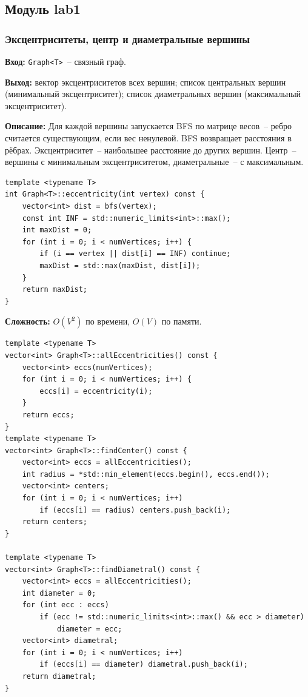 \subsection{Модуль lab1}

\subsubsection{Эксцентриситеты, центр и диаметральные вершины}

\textbf{Вход:} \texttt{Graph<T>}~-- связный граф.

\textbf{Выход:} вектор эксцентриситетов всех вершин; список центральных
вершин (минимальный эксцентриситет); список диаметральных вершин
(максимальный эксцентриситет).

\textbf{Описание:} Для каждой вершины запускается BFS по матрице весов~--
ребро считается существующим, если вес ненулевой. BFS возвращает
расстояния в рёбрах. Эксцентриситет~-- наибольшее расстояние до других вершин.
Центр~-- вершины с минимальным эксцентриситетом, диаметральные~-- с максимальным.

\begin{lstlisting}[style=cstyle, caption={BFS и вычисление эксцентриситета (graph.cpp)}]
template <typename T>
int Graph<T>::eccentricity(int vertex) const {
    vector<int> dist = bfs(vertex);
    const int INF = std::numeric_limits<int>::max();
    int maxDist = 0;
    for (int i = 0; i < numVertices; i++) {
        if (i == vertex || dist[i] == INF) continue;
        maxDist = std::max(maxDist, dist[i]);
    }
    return maxDist;
}
\end{lstlisting}

\textbf{Сложность:} $O(V^2)$ по времени, $O(V)$ по памяти.

\begin{lstlisting}[style=cstyle, caption={Поиск центра и диаметральных вершин (graph.cpp)}]
template <typename T>
vector<int> Graph<T>::allEccentricities() const {
	vector<int> eccs(numVertices);
	for (int i = 0; i < numVertices; i++) {
		eccs[i] = eccentricity(i);
	}
	return eccs;
}
template <typename T>
vector<int> Graph<T>::findCenter() const {
    vector<int> eccs = allEccentricities();
    int radius = *std::min_element(eccs.begin(), eccs.end());
    vector<int> centers;
    for (int i = 0; i < numVertices; i++)
        if (eccs[i] == radius) centers.push_back(i);
    return centers;
}

template <typename T>
vector<int> Graph<T>::findDiametral() const {
    vector<int> eccs = allEccentricities();
    int diameter = 0;
    for (int ecc : eccs)
        if (ecc != std::numeric_limits<int>::max() && ecc > diameter)
            diameter = ecc;
    vector<int> diametral;
    for (int i = 0; i < numVertices; i++)
        if (eccs[i] == diameter) diametral.push_back(i);
    return diametral;
}
\end{lstlisting}

